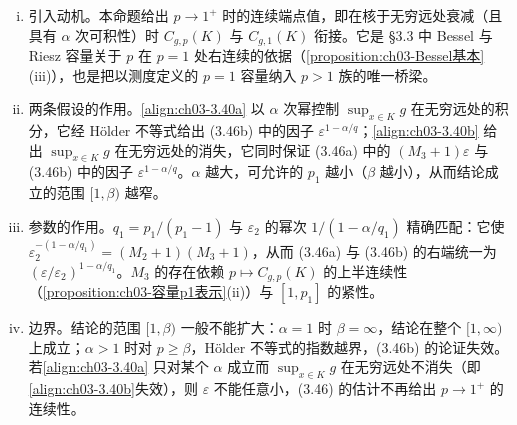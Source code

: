 \documentclass[../../main.tex]{subfiles}%
\begin{document}
\begin{remark}\label{remark:ch03-p趋近1}
\begin{enumerate}[(i)]
\item 引入动机。本命题给出 $p\to1^+$ 时的连续端点值，即在核于无穷远处衰减（且具有 $\alpha$ 次可积性）时 $C_{g,p}(K)$ 与 $C_{g,1}(K)$ 衔接。它是 \S3.3 中 Bessel 与 Riesz 容量关于 $p$ 在 $p=1$ 处右连续的依据（\cref{proposition:ch03-Bessel基本}(iii)），也是把以测度定义的 $p=1$ 容量纳入 $p>1$ 族的唯一桥梁。

\item 两条假设的作用。\eqref{align:ch03-3.40a} 以 $\alpha$ 次幂控制 $\sup_{x\in K}g$ 在无穷远处的积分，它经 Hölder 不等式给出 (3.46b) 中的因子 $\varepsilon^{1-\alpha/q}$；\eqref{align:ch03-3.40b} 给出 $\sup_{x\in K}g$ 在无穷远处的消失，它同时保证 (3.46a) 中的 $(M_3+1)\varepsilon$ 与 (3.46b) 中的因子 $\varepsilon^{1-\alpha/q}$。$\alpha$ 越大，可允许的 $p_1$ 越小（$\beta$ 越小），从而结论成立的范围 $[1,\beta)$ 越窄。

\item 参数的作用。$q_1=p_1/(p_1-1)$ 与 $\varepsilon_2$ 的幂次 $1/(1-\alpha/q_1)$ 精确匹配：它使 $\varepsilon_2^{-(1-\alpha/q_1)}=(M_2+1)(M_3+1)$，从而 (3.46a) 与 (3.46b) 的右端统一为 $(\varepsilon/\varepsilon_2)^{1-\alpha/q_1}$。$M_3$ 的存在依赖 $p\mapsto C_{g,p}(K)$ 的上半连续性（\cref{proposition:ch03-容量p1表示}(ii)）与 $[1,p_1]$ 的紧性。

\item 边界。结论的范围 $[1,\beta)$ 一般不能扩大：$\alpha=1$ 时 $\beta=\infty$，结论在整个 $[1,\infty)$ 上成立；$\alpha>1$ 时对 $p\geqslant\beta$，Hölder 不等式的指数越界，(3.46b) 的论证失效。若\eqref{align:ch03-3.40a} 只对某个 $\alpha$ 成立而 $\sup_{x\in K}g$ 在无穷远处不消失（即\eqref{align:ch03-3.40b}失效），则 $\varepsilon$ 不能任意小，(3.46) 的估计不再给出 $p\to1^+$ 的连续性。
\end{enumerate}
\end{remark}
\end{document}
